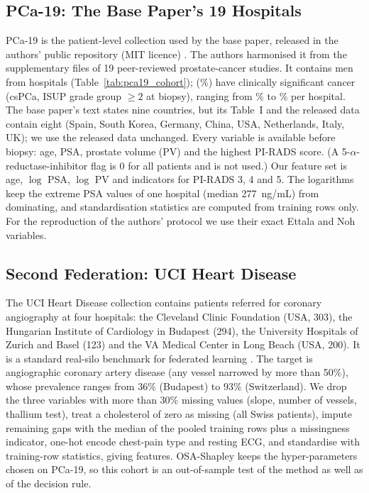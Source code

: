 \documentclass[journal]{IEEEtran}
\begin{document}
\subsection{PCa-19: The Base Paper's 19 Hospitals}
PCa-19 is the patient-level collection used by the base paper, released in the authors' public repository (MIT licence) \cite{Kazlouski2025HospitalParticipation}. The authors harmonised it from the supplementary files of 19 peer-reviewed prostate-cancer studies. It contains \pNineN{} men from \pNineHosp{} hospitals (Table~\ref{tab:pca19_cohort}); \pNinePos{} (\pNinePrev\%) have clinically significant cancer (csPCa, ISUP grade group $\geq 2$ at biopsy), ranging from \pNinePrevLo\% to \pNinePrevHi\% per hospital. The base paper's text states nine countries, but its Table~I and the released data contain eight (Spain, South Korea, Germany, China, USA, Netherlands, Italy, UK); we use the released data unchanged. Every variable is available before biopsy: age, PSA, prostate volume (PV) and the highest PI-RADS score. (A 5-$\alpha$-reductase-inhibitor flag is 0 for all patients and is not used.) Our feature set is age, $\log$ PSA, $\log$ PV and indicators for PI-RADS 3, 4 and 5. The logarithms keep the extreme PSA values of one hospital (median 277~ng/mL) from dominating, and standardisation statistics are computed from training rows only. For the reproduction of the authors' protocol we use their exact Ettala and Noh variables.



\subsection{Second Federation: UCI Heart Disease}
\label{sec:heart_data}
The UCI Heart Disease collection \cite{Janosi1988HeartDisease, Detrano1989Heart} contains \hrN{} patients referred for coronary angiography at four hospitals: the Cleveland Clinic Foundation (USA, 303), the Hungarian Institute of Cardiology in Budapest (294), the University Hospitals of Zurich and Basel (123) and the VA Medical Center in Long Beach (USA, 200). It is a standard real-silo benchmark for federated learning \cite{Terrail2022FLamby}. The target is angiographic coronary artery disease (any vessel narrowed by more than 50\%), whose prevalence ranges from 36\% (Budapest) to 93\% (Switzerland). We drop the three variables with more than 30\% missing values (slope, number of vessels, thallium test), treat a cholesterol of zero as missing (all Swiss patients), impute remaining gaps with the median of the pooled training rows plus a missingness indicator, one-hot encode chest-pain type and resting ECG, and standardise with training-row statistics, giving \hrFeat{} features. OSA-Shapley keeps the hyper-parameters chosen on PCa-19, so this cohort is an out-of-sample test of the method as well as of the decision rule.
\end{document}
